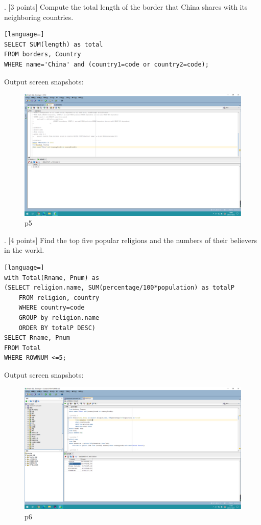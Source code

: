 \documentclass[]{article}
\begin{document}
	. [3 points] Compute the total length of the border that China shares with its neighboring countries.  \\
	
	\begin{lstlisting}[language=] 
SELECT SUM(length) as total
FROM borders, Country
WHERE name='China' and (country1=code or country2=code);
	\end{lstlisting} 
	Output screen snapshots:
	\begin{figure}[H]
		\centering
		\includegraphics[width=1\linewidth]{../screen/p5}
		\caption{p5}
		\label{fig:p5}
	\end{figure}
	
	. [4 points] Find the top five popular religions and the numbers of their believers in the world.  \\
	
	\begin{lstlisting}[language=] 
with Total(Rname, Pnum) as 
(SELECT religion.name, SUM(percentage/100*population) as totalP
	FROM religion, country
	WHERE country=code
	GROUP by religion.name
	ORDER BY totalP DESC)
SELECT Rname, Pnum
FROM Total
WHERE ROWNUM <=5;
	\end{lstlisting} 
	Output screen snapshots:
	\begin{figure}[H]
		\centering
		\includegraphics[width=0.9\linewidth]{../screen/p6}
		\caption{p6}
		\label{fig:p6}
	\end{figure}
	
\end{document}
